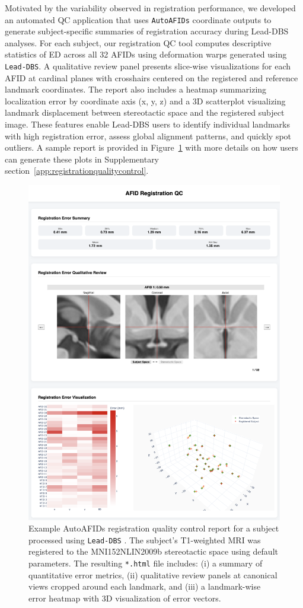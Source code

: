 Motivated by the variability observed in registration performance, we developed an automated QC application that uses \texttt{AutoAFIDs} coordinate outputs to generate subject-specific summaries of registration accuracy during Lead-DBS analyses. For each subject, our registration QC tool computes descriptive statistics of ED across all 32 AFIDs using deformation warps generated using \texttt{Lead-DBS}. A qualitative review panel presents slice-wise visualizations for each AFID at cardinal planes with crosshairs centered on the registered and reference landmark coordinates. The report also includes a heatmap summarizing localization error by coordinate axis (x, y, z) and a 3D scatterplot visualizing landmark displacement between stereotactic space and the registered subject image. These features enable Lead-DBS users to identify individual landmarks with high registration error, assess global alignment patterns, and quickly spot outliers. A sample report is provided in Figure~\ref{fig:figuresupregqc} with more details on how users can generate these plots in Supplementary section~\ref{app:registrationqualitycontrol}.

\begin{figure}[hbt!]
    \centering
    \includegraphics[width=0.80\linewidth]{figs/figuresupregqc.png}
    \caption{Example AutoAFIDs registration quality control report for a subject processed using \texttt{Lead-DBS} \cite{Neudorfer2023-wd}. The subject’s T1-weighted MRI was registered to the MNI152NLIN2009b stereotactic space using default parameters. The resulting \texttt{*.html} file includes: (i) a summary of quantitative error metrics, (ii) qualitative review panels at canonical views cropped around each landmark, and (iii) a landmark-wise error heatmap with 3D visualization of error vectors.}
    \label{fig:figuresupregqc}
\end{figure}

